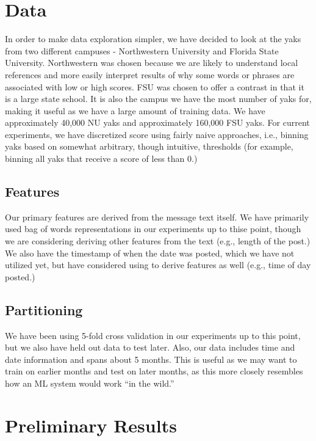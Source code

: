 \documentclass{sigchi}
\begin{document}
\section{Data}

In order to make data exploration simpler, we have decided to look at the yaks
from two different campuses - Northwestern University and Florida State
University. Northwestern was chosen because we are likely to understand local
references and more easily interpret results of why some words or phrases are
associated with low or high scores. FSU was chosen to offer a contrast in that
it is a large state school. It is also the campus we have the most number of
yaks for, making it useful as we have a large amount of training data. We have
approximately 40,000 NU yaks and approximately 160,000 FSU yaks. For current
experiments, we have discretized score using fairly naive approaches, i.e.,
binning yaks based on somewhat arbitrary, though intuitive, thresholds (for
example, binning all yaks that receive a score of less than 0.)

\subsection{Features}

Our primary features are derived from the message text itself. We have primarily
used bag of words representations in our experiments up to thise point, though
we are considering deriving other features from the text (e.g., length of the
post.) We also have the timestamp of when the date was posted, which we have not
utilized yet, but have considered using to derive features as well (e.g., time
of day posted.)

\subsection{Partitioning}

We have been using 5-fold cross validation in our experiments up to this point,
but we also have held out data to test later. Also, our data includes time and
date information and spans about 5 months. This is useful as we may want to
train on earlier months and test on later months, as this more closely resembles
how an ML system would work ``in the wild.''

\section{Preliminary Results}
\end{document}
